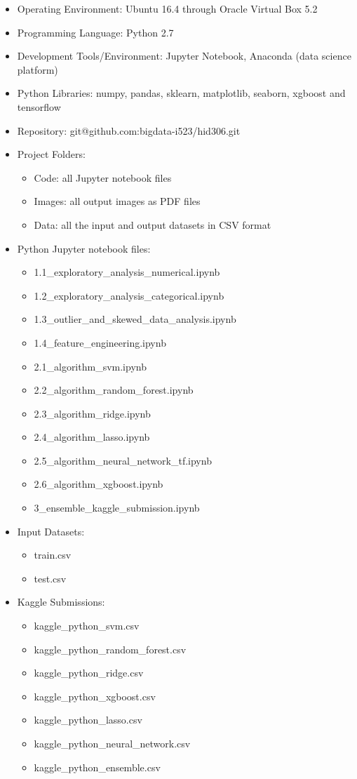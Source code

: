 \documentclass[sigconf]{acmart}
\begin{document}
	\begin{itemize}
		\item Operating Environment: Ubuntu 16.4 through Oracle Virtual Box 5.2
		\item Programming Language: Python 2.7
		\item Development Tools/Environment: Jupyter Notebook, Anaconda (data science platform)
		\item Python Libraries: numpy, pandas, sklearn, matplotlib, seaborn, xgboost and tensorflow
		\item Repository: git@github.com:bigdata-i523/hid306.git
		\item Project Folders:
		\begin{itemize}
			\item Code: all Jupyter notebook files
			\item Images: all output images as PDF files
			\item Data: all the input and output datasets in CSV format
		\end{itemize}
		\item Python Jupyter notebook files:
		\begin{itemize}
			\item 1.1\_exploratory\_analysis\_numerical.ipynb
			\item 1.2\_exploratory\_analysis\_categorical.ipynb
			\item 1.3\_outlier\_and\_skewed\_data\_analysis.ipynb
			\item 1.4\_feature\_engineering.ipynb
			\item 2.1\_algorithm\_svm.ipynb
			\item 2.2\_algorithm\_random\_forest.ipynb
			\item 2.3\_algorithm\_ridge.ipynb
			\item 2.4\_algorithm\_lasso.ipynb
			\item 2.5\_algorithm\_neural\_network\_tf.ipynb
			\item 2.6\_algorithm\_xgboost.ipynb
			\item 3\_ensemble\_kaggle\_submission.ipynb	    	
		\end{itemize}
		\item Input Datasets: 
		\begin{itemize}
			\item train.csv
			\item test.csv
		\end{itemize}  
		\item Kaggle Submissions:
		\begin{itemize}
			\item kaggle\_python\_svm.csv
			\item kaggle\_python\_random\_forest.csv
			\item kaggle\_python\_ridge.csv
			\item kaggle\_python\_xgboost.csv
			\item kaggle\_python\_lasso.csv
			\item kaggle\_python\_neural\_network.csv
			\item kaggle\_python\_ensemble.csv
		\end{itemize}    	
	\end{itemize}    
	
\end{document}
